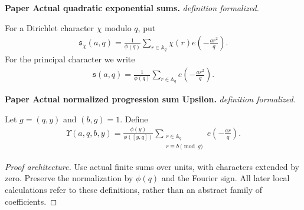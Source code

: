 \begin{definition}
\label{QuadraticSums}
\uses{}
\leanok
\par\medskip\noindent\textbf{Paper Actual quadratic exponential sums.} \textit{definition formalized.}\par
For a Dirichlet character $\chi$ modulo $q$, put
\begin{align}
 \mathfrak s_\chi(a,q)
 =\frac1{\phi(q)}\sum_{r\in\mathbb A_q}
 \chi(r)e\left(-\frac{ar^2}{q}\right).
\end{align}
For the principal character we write
\begin{align}
 \mathfrak s(a,q)
 =\frac1{\phi(q)}\sum_{r\in\mathbb A_q}
 e\left(-\frac{ar^2}{q}\right).
\end{align}
\par\medskip\noindent\textbf{Paper Actual normalized progression sum Upsilon.} \textit{definition formalized.}\par
Let $g=(q,y)$ and $(b,g)=1$.  Define
\begin{align}
 \Upsilon(a,q,b,y)=\frac{\phi(y)}{\phi([y,q])}
 \sum_{\substack{r\in\mathbb A_q\\r\equiv b\pmod g}}
 e\left(-\frac{ar}{q}\right).
\end{align}
\end{definition}
\begin{proof}[Proof architecture]
\uses{}
\leanok
Use actual finite sums over units, with characters extended by zero. Preserve the normalization by $\phi(q)$ and the Fourier sign. All later local calculations refer to these definitions, rather than an abstract family of coefficients.
\end{proof}

